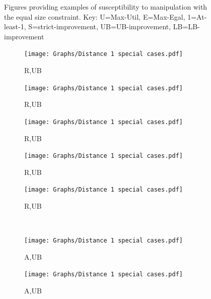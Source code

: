 \begin{figure}[t]
    
    \caption{Figures providing examples of susceptibility to manipulation with the equal size constraint. Key: U=Max-Util, E=Max-Egal, 1=At-least-1, S=strict-improvement, UB=UB-improvement, LB=LB-improvement}
    \label{fig:es_graphs}
\end{figure}

\begin{figure}
    \centering
    \begin{subfigure}{0.07\textwidth}
        \centering
        \texttt{[image: Graphs/Distance 1 special cases.pdf]}
        \caption{R,UB}
        \label{fig:thrm5_1}
    \end{subfigure}
    \hfill
    \begin{subfigure}{0.07\textwidth}
        \centering
        \texttt{[image: Graphs/Distance 1 special cases.pdf]}
        \caption{R,UB}
        \label{fig:thrm5_2}
    \end{subfigure}
    \hfill
    \begin{subfigure}{0.07\textwidth}
        \centering
        \texttt{[image: Graphs/Distance 1 special cases.pdf]}
        \caption{R,UB}
        \label{fig:thrm5_3}
    \end{subfigure}
    \hfill
    \begin{subfigure}{0.07\textwidth}
        \centering
        \texttt{[image: Graphs/Distance 1 special cases.pdf]}
        \caption{R,UB}
        \label{fig:thrm5_4}
    \end{subfigure}
    \hfill
    \begin{subfigure}{0.07\textwidth}
        \centering
        \texttt{[image: Graphs/Distance 1 special cases.pdf]}
        \caption{R,UB}
        \label{fig:thrm5_5}
    \end{subfigure}
    \\
    \begin{subfigure}{0.07\textwidth}
        \centering
        \texttt{[image: Graphs/Distance 1 special cases.pdf]}
        \caption{A,UB}
        \label{fig:unsafeutil1}
    \end{subfigure}
    \hfill
    \begin{subfigure}{0.07\textwidth}
        \centering
        \texttt{[image: Graphs/Distance 1 special cases.pdf]}
        \caption{A,UB}
        \label{fig:unsafeutil2}
    \end{subfigure}
    \hfill
    \begin{subfigure}{0.07\textwidth}

\end{subfigure}
\end{figure}
